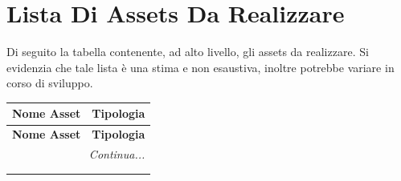 \documentclass[10pt, openany]{article}
\begin{document}
  \section{Lista Di Assets Da Realizzare}
  Di seguito la tabella contenente, ad alto livello, gli assets da realizzare. Si evidenzia che tale lista \`e una stima e non esaustiva, inoltre potrebbe variare in corso di sviluppo.
  \renewcommand{\arraystretch}{1.5}
  \begin{longtable}{@{} p{} p{} @{}}
    \toprule
    \textbf{Nome Asset} & \textbf{Tipologia} \\
    \midrule
    \endfirsthead

    \toprule
    \textbf{Nome Asset} & \textbf{Tipologia} \\
    \midrule
    \endhead

    \midrule
    \multicolumn{2}{r}{\textit{Continua...}} \\
    \bottomrule
    \endfoot

    \midrule
    \multicolumn{2}{r}{\textit{Fine Tabella}} \\
    \bottomrule
    \endlastfoot


\end{longtable}
\end{document}
